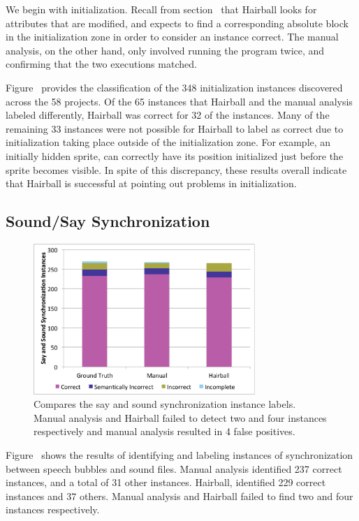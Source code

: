 We begin with initialization. Recall from section~ that
Hairball looks for attributes that are modified, and expects to find a
corresponding absolute block in the initialization zone in order to consider an
instance correct. The manual analysis, on the other hand, only involved running
the program twice, and confirming that the two executions matched.

Figure~ provides the classification of the 348
initialization instances discovered across the 58 projects. Of the 65 instances
that Hairball and the manual analysis labeled differently, Hairball was correct
for 32 of the instances. Many of the remaining 33 instances were not possible
for Hairball to label as correct due to initialization taking place outside of
the initialization zone. For example, an initially hidden sprite, can correctly
have its position initialized just before the sprite becomes visible. In spite
of this discrepancy, these results overall indicate that Hairball is successful
at pointing out problems in initialization.

\subsection{Sound/Say Synchronization}
\begin{figure}[!t]
\centering \includegraphics[trim=.3in .15in .3in .15in, clip,
  width=3.3in]{graphs/AutoSaySoundSync.eps}
\caption{Compares the say and sound synchronization instance labels. Manual
  analysis and Hairball failed to detect two and four instances respectively
  and manual analysis resulted in 4 false positives.}
\end{figure}


Figure~ shows the results of identifying and
labeling instances of synchronization between speech bubbles and sound
files. Manual analysis identified 237 correct instances, and a total of 31
other instances. Hairball, identified 229 correct instances and 37
others. Manual analysis and Hairball failed to find two and four instances
respectively.

